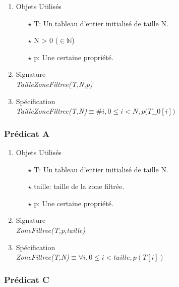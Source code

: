 \documentclass[a4paper, 11pt, oneside]{article}
\begin{document}
        \begin{enumerate}
            \item Objets Utilisés
                \begin{itemize}
                    \item[$\star$] T: Un tableau d'entier initialisé de taille N.
                    \item[$\star$] N > 0 ($\in \mathbb{N}$)
                    \item[$\star$] p: Une certaine propriété. 
                \end{itemize}

            \item Signature \\
                \textit{TailleZoneFiltree(T,N,p)}

            \item Spécification\\
                \textit{TailleZoneFiltree(T,N)}$\equiv \# i, 0\leq i < N, p(T$_0$[i])$
        \end{enumerate}

        \subsubsection{Prédicat A}

        \begin{enumerate}
            \item Objets Utilisés
                \begin{itemize}
                    \item[$\star$] T: Un tableau d'entier initialisé de taille N.
                    \item[$\star$] taille: taille de la zone filtrée.
                    \item[$\star$] p: Une certaine propriété. 
                \end{itemize}

            \item Signature \\
                \textit{ZoneFiltree(T,p,taille)}

            \item Spécification\\
                \textit{ZoneFiltree(T,N)}$\equiv \forall i, 0\leq i < taille, p(T[i])$
        \end{enumerate}

        \subsubsection{Prédicat C}
\end{document}
